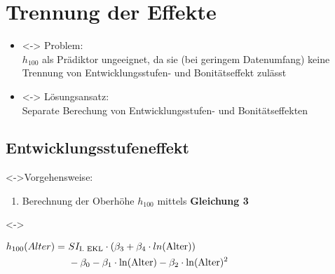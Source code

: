\section{Trennung der Effekte}
\begin{frame}[c]

  \begin{itemize}
  \item<\theFirstElement-> Problem: \\
    \(h_{100}\) als Prädiktor ungeeignet, da sie (bei geringem Datenumfang) keine Trennung von Entwicklungsstufen- und Bonitätseffekt zulässt
  \item<\theFirstElement-> Lösungsansatz: \\
    Separate Berechung von Entwicklungsstufen- und Bonitätseffekten
  \end{itemize}


\end{frame}

\subsection{Entwicklungsstufeneffekt}

\begin{frame}[c]
  \visible<\theFirstElement->{Vorgehensweise:}
  \begin{enumerate}
  \item Berechnung der Oberhöhe \(h_{100}\) mittels \textbf{Gleichung 3}
  \end{enumerate}
  
    \visible<\theFirstElement->{\begin{center}
      \begin{minipage}{0.665\linewidth}
        \centerline{\(\begin{aligned}[t]h_{100}(Alter) =~ &SI_{\text{I. EKL}} \cdot (\beta_3 + \beta_4 \cdot ln(\text{Alter})) \\ &- \beta_0 - \beta_1 \cdot \ln(\text{Alter}) - \beta_2 \cdot \ln(\text{Alter})^2{}\end{aligned}\)}
        \vspace{\captiondistance}
      \end{minipage}
    \end{center}}
\end{frame}

